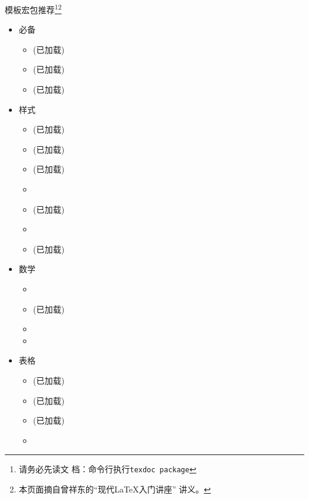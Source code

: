 \documentclass[fontset = none, xcolor=svgnames, t, aspectratio=169]{ctexbeamer}
\begin{document}
\begin{frame}{\nwafuthesis 模板}{宏包推荐\footnote[frame,3]{请务必先读文
      档：命令行执行\alert{\texttt{texdoc package}}}\footnote[frame,4]{本页面摘自曾祥东的\enquote{现代\LaTeX 入门讲座}
      讲义。}}
  \stretchon
  \footnotesize
  \setlength{\leftmarginii}{1.5em}
  \vspace{-18ex}
  \begin{multicols}{3}
    \begin{itemize}
    \item 必备

      \begin{itemize}
      \item {}(已加载)
      \item {}(已加载)
      \item {}(已加载)
      \end{itemize}

    \item 样式

      \begin{itemize}
      \item {}(已加载)
      \item {}(已加载)
      \item {}(已加载)
      \item {}
      \item {}(已加载)
      \item {}
      \item {}(已加载)
      \end{itemize}

    \item 数学

      \begin{itemize}
      \item {}
      \item {}(已加载)
      \item {}
      \item {}
      \end{itemize}

    \item 表格

      \begin{itemize}
      \item {}(已加载)
      \item {}(已加载)
      \item {}(已加载)
      \item {}
      \end{itemize}


\end{itemize}
\end{multicols}
\end{frame}
\end{document}
